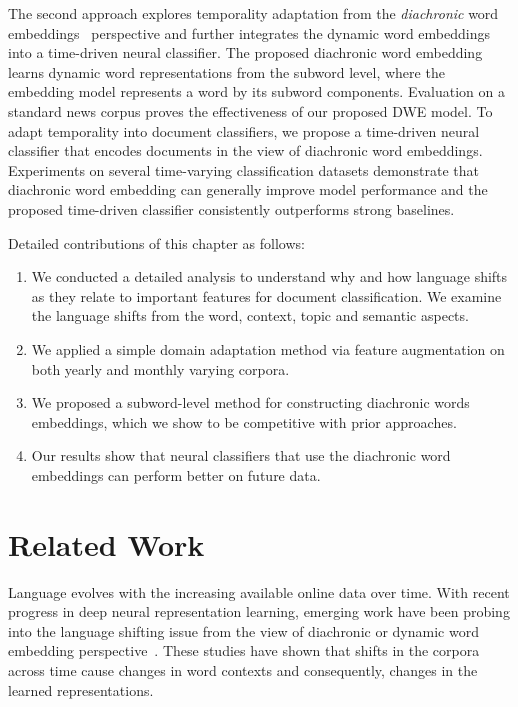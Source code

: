 The second approach explores temporality adaptation from the {\em diachronic} word embeddings~\cite{kutuzov2018diachronic} perspective and further integrates the dynamic word embeddings into a time-driven neural classifier.
The proposed diachronic word embedding learns dynamic word representations from the subword level, where the embedding model represents a word by its subword components. 
Evaluation on a standard news corpus proves the effectiveness of our proposed DWE model. 
To adapt temporality into document classifiers, we propose a time-driven neural classifier that encodes documents in the view of diachronic word embeddings.
Experiments on several time-varying classification datasets demonstrate that diachronic word embedding can generally improve model performance and the proposed time-driven classifier consistently outperforms strong baselines. 

Detailed contributions of this chapter as follows:

\begin{enumerate}
    \item We conducted a detailed analysis to understand why and how language shifts as they relate to important features for document classification. We examine the language shifts from the word, context, topic and semantic aspects.
    \item We applied a simple domain adaptation method via feature augmentation on both yearly and monthly varying corpora.
    \item We proposed a subword-level method for constructing diachronic words embeddings, which we show to be competitive with prior approaches. 
    \item Our results show that neural classifiers that use the diachronic word embeddings can perform better on future data. 
\end{enumerate}


\section{Related Work}
\label{chap3:sec:survey}

Language evolves with the increasing available online data over time. 
With recent progress in deep neural representation learning, emerging work have been probing into the language shifting issue from the view of diachronic or dynamic word embedding perspective~\cite{tang2018state, kutuzov2018diachronic}.
These studies have shown that shifts in the corpora across time cause changes in word contexts and consequently, changes in the learned representations. 

